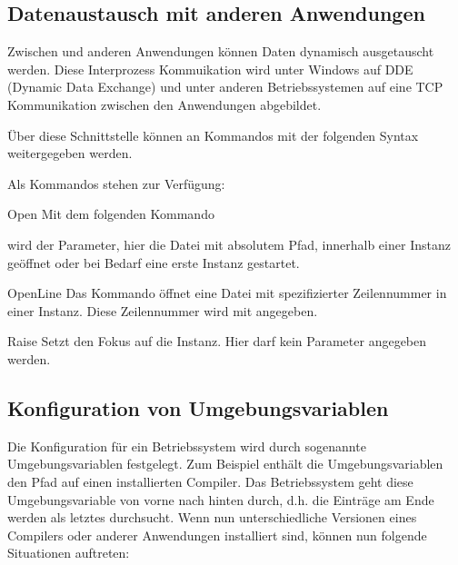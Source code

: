 \subsection{Datenaustausch mit anderen Anwendungen}

Zwischen \codeblocks und anderen Anwendungen können Daten dynamisch ausgetauscht werden. Diese Interprozess Kommuikation wird unter Windows auf DDE (Dynamic Data Exchange) und unter anderen Betriebssystemen auf eine TCP Kommunikation zwischen den Anwendungen abgebildet.

Über diese Schnittstelle können an \codeblocks Kommandos mit der folgenden Syntax weitergegeben werden.

\begin{code}
\end{code}

Als Kommandos stehen zur Verfügung:

\begin{codeentry}
\item[Open] Mit dem folgenden Kommando

\begin{code}
\end{code}

wird der Parameter, hier die Datei mit absolutem Pfad, innerhalb einer \codeblocks Instanz geöffnet oder bei Bedarf eine erste Instanz gestartet.
\item[OpenLine] Das Kommando öffnet eine Datei mit spezifizierter Zeilennummer in einer \codeblocks Instanz. Diese Zeilennummer wird mit  angegeben.

\begin{code}
\end{code}

\item[Raise] Setzt den Fokus auf die \codeblocks Instanz. Hier darf kein Parameter angegeben werden.
\end{codeentry}

\subsection{Konfiguration von Umgebungsvariablen}

Die Konfiguration für ein Betriebssystem wird durch sogenannte Umgebungsvariablen festgelegt. Zum Beispiel enthält die Umgebungsvariablen  den Pfad auf einen installierten Compiler. Das Betriebssystem geht diese Umgebungsvariable von vorne nach hinten durch, d.h. die Einträge am Ende werden als letztes durchsucht. Wenn nun unterschiedliche Versionen eines Compilers oder anderer Anwendungen installiert sind, können nun folgende Situationen auftreten:

